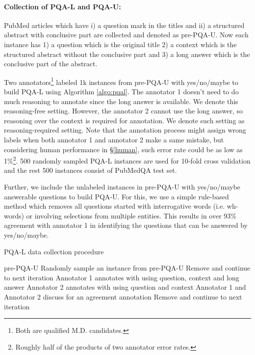 \documentclass[11pt,a4paper]{article}
\begin{document}
\paragraph{Collection of PQA-L and PQA-U:} PubMed articles which have i) a question mark in the titles and ii) a structured abstract with conclusive part are collected and denoted as pre-PQA-U. Now each instance has 1) a question which is the original title 2) a context which is the structured abstract without the conclusive part and 3) a long answer which is the conclusive part of the abstract.

Two annotators\footnote{Both are qualified M.D. candidates.} labeled 1k instances from pre-PQA-U with yes/no/maybe to build PQA-L using Algorithm \ref{algo:pqal}. The annotator 1 doesn't need to do much reasoning to annotate since the long answer is available. We denote this reasoning-free setting. However, the annotator 2 cannot use the long answer, so reasoning over the context is required for annotation. We denote such setting as reasoning-required setting.
Note that the annotation process might assign wrong labels when both annotator 1 and annotator 2 make a same mistake, but considering human performance in \S\ref{human}, such error rate could be as low as 1\%\footnote{Roughly half of the products of two annotator error rates.}. 500 randomly sampled PQA-L instances are used for 10-fold cross validation and the rest 500 instances consist of PubMedQA test set.

Further, we include the unlabeled instances in pre-PQA-U with yes/no/maybe answerable questions to build PQA-U. For this, we use a simple rule-based method which removes all questions started with interrogative words (i.e. wh-words) or involving selections from multiple entities. This results in over 93\% agreement with annotator 1 in identifying the questions that can be answered by yes/no/maybe.

\begin{algorithm}[t]
\small
    \caption{PQA-L data collection procedure}
    \label{algo:pqal}
\begin{algorithmic}
     pre-PQA-U
    \STATE 
    \STATE 
    \STATE     
        \STATE Randomly sample an instance  from pre-PQA-U
            \STATE Remove  and continue to next iteration
        \ENDIF
        \STATE Annotator 1 annotates   with  using question, context and long answer
        \STATE Annotator 2 annotates  with  using question and context
        \IF {}
            \STATE 
        \ELSE
            \STATE Annotator 1 and Annotator 2 discuss for an agreement annotation 
                \STATE Remove  and continue to next iteration
            \ENDIF
        \ENDIF
        \STATE 
        \STATE 
        \STATE 
    \ENDWHILE
\end{algorithmic}
\end{algorithm}
\vspace{-0.5em}
\end{document}
